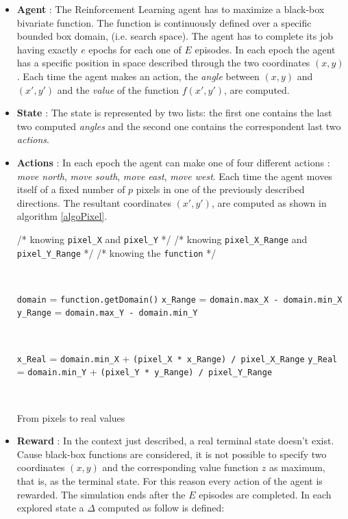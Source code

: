 \begin{itemize}
	
	\item \textbf{Agent} : The Reinforcement Learning agent has to maximize a black-box bivariate function. The function is continuously defined over a specific bounded box domain, (i.e. search space). The agent has to complete its job having exactly $e$ epochs for each one of $E$ episodes. In each epoch the agent has a specific position in space described through the two coordinates $(x, y)$. Each time the agent makes an action, the \textit{angle} between $(x, y)$ and $(x', y')$ and the \textit{value} of the function $f(x', y')$, are computed.
	
	\item \textbf{State} : The state is represented by two lists: the first one contains the last two computed \textit{angles} and the second one contains the correspondent last two \textit{actions}.
	
	\item \textbf{Actions} : In each epoch the agent can make one of four different actions : \textit{move north}, \textit{move  south}, \textit{move east}, \textit{move west}. Each time the agent moves itself of a fixed number of $p$ pixels in one of the previously described directions. The resultant coordinates $(x', y')$, are computed as shown in algorithm \ref{algoPixel}.
	
	\begin{algorithm} [h!]
		/* knowing {\tt pixel\_X} and {\tt pixel\_Y} */\;
		/* knowing {\tt pixel\_X\_Range} and {\tt pixel\_Y\_Range} */ \;
		/* knowing the {\tt function} */\;
		
		\
		
		{\tt domain} = {\tt function.getDomain()} \;
		{\tt x\_Range} = {\tt domain.max\_X - domain.min\_X} \;
		{\tt y\_Range} = {\tt domain.max\_Y - domain.min\_Y} \;
		
		\
		
		{\tt x\_Real} = {\tt domain.min\_X} + {\tt(pixel\_X * x\_Range) / pixel\_X\_Range} \;
		{\tt y\_Real} = {\tt domain.min\_Y} + {\tt (pixel\_Y * y\_Range) / pixel\_Y\_Range} \;
		
		\
		
		\caption{From pixels to real values} 
		\label{algoPixel}
	\end{algorithm}
	
	\item \textbf{Reward} : In the context just described, a real terminal state doesn't exist. Cause black-box functions are considered, it is not possible to specify two coordinates $(x, y)$ and the corresponding value function $z$ as maximum, that is, as the terminal state. For this reason every action of the agent is rewarded. The simulation ends after the $E$ episodes are completed.
	In each explored state a $\Delta$ computed as follow is defined: 
	

\end{itemize}

